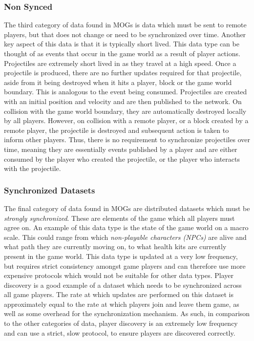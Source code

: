 \subsubsection*{Non Synced}
The third category of data found in MOGs is data which must be sent to remote players, but that does not change or need to be synchronized over time. Another key aspect of this data is that it is typically short lived. This data type can be thought of as events that occur in the game world as a result of player actions. Projectiles are extremely short lived in \game{} as they travel at a high speed. Once a projectile is produced, there are no further updates required for that projectile, aside from it being destroyed when it hits a player, block or the game world boundary. This is analogous to the event being consumed. Projectiles are created with an initial position and velocity and are then published to the network. On collision with the game world boundary, they are automatically destroyed locally by all players. However, on collision with a remote player, or a block created by a remote player, the projectile is destroyed and subsequent action is taken to inform other players. Thus, there is no requirement to synchronize projectiles over time, meaning they are essentially events published by a player and are either consumed by the player who created the projectile, or the player who interacts with the projectile.

\subsubsection*{Synchronized Datasets}       
The final category of data found in MOGs are distributed datasets which must be \textit{strongly synchronized}. These are elements of the game which all players must agree on. An example of this data type is the state of the game world on a macro scale. This could range from which \textit{non-playable characters (NPCs)} are alive and what path they are currently moving on, to what health kits are currently present in the game world. This data type is updated at a very low frequency, but requires strict consistency amongst game players and can therefore use more expensive protocols which would not be suitable for other data types. Player discovery is a good example of a dataset which needs to be synchronized across all game players. The rate at which updates are performed on this dataset is approximately equal to the rate at which players join and leave them game, as well as some overhead for the synchronization mechanism. As such, in comparison to the other categories of data, player discovery is an extremely low frequency and can use a strict, slow protocol, to ensure players are discovered correctly.

